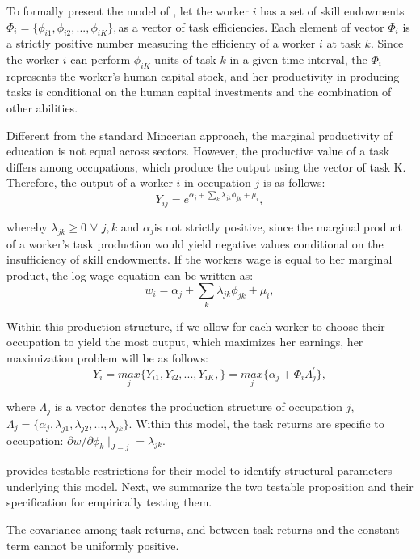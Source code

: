 \begin{onehalfspace}
To formally present the model of \citet{2013Autora}, let the worker
$i$ has a set of skill endowments $\Phi_{i}=\{\phi_{i1},\phi_{i2},...,\phi_{iK}\},$as
a vector of task efficiencies. Each element of vector $\Phi_{i}$
is a strictly positive number measuring the efficiency of a worker
$i$ at task $k$. Since the worker $i$ can perform $\phi_{iK}$
units of task $k$ in a given time interval, the $\Phi_{i}$ represents
the worker's human capital stock, and her productivity in producing
tasks is conditional on the human capital investments and the combination
of other abilities. 

Different from the standard Mincerian approach, the marginal productivity
of education is not equal across sectors. However, the productive
value of a task differs among occupations, which produce the output
using the vector of task K. Therefore, the output of a worker $i$
in occupation $j$ is as follows:
\[
Y_{ij}=e^{\alpha_{j}+\sum_{k}\lambda_{jk}\phi_{jk}+\mu_{i}},
\]

whereby $\lambda_{jk}$$\geq0$ $\forall$ $j,k$ and $\alpha_{j}$is
not strictly positive, since the marginal product of a worker's task
production would yield negative values conditional on the insufficiency
of skill endowments. If the workers wage is equal to her marginal
product, the log wage equation can be written as:
\[
w_{i}=\alpha_{j}+\sum_{k}\lambda_{jk}\phi_{jk}+\mu_{i},
\]

Within this production structure, if we allow for each worker to choose
their occupation to yield the most output, which maximizes her earnings,
her maximization problem will be as follows:
\[
Y_{i}=\underset{j}{max}\{Y_{i1},Y_{i2},...,Y_{iK},\}=\underset{j}{max}\{\alpha_{j}+\Phi_{i}\Lambda_{j}^{\prime}\},
\]

where $\Lambda_{j}$ is a vector denotes the production structure
of occupation $j$, $\Lambda_{j}=\{\alpha_{j},\lambda_{j1},\lambda_{j2},\allowbreak...,\lambda_{jk}\}$.
Within this model, the task returns are specific to occupation: $\partial w/\partial\phi_{k}\mid_{J=j}=\lambda_{jk}$. 

\citet{2013Autora} provides testable restrictions for their model
to identify structural parameters underlying this model. Next, we
summarize the two testable proposition and their specification for
empirically testing them. 
\end{onehalfspace}

\begin{theorem}

\begin{onehalfspace}
The covariance among task returns, and between task returns and the
constant term cannot be uniformly positive. 
\end{onehalfspace}

\end{theorem}

